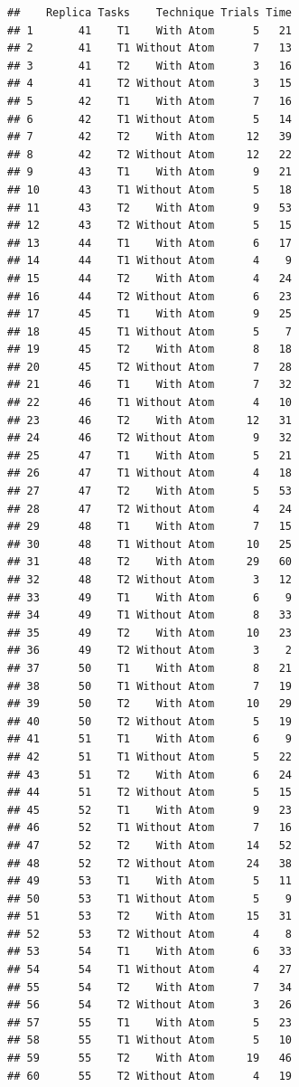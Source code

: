 \documentclass[]{article}
\begin{document}
\begin{verbatim}
##    Replica Tasks    Technique Trials Time
## 1       41    T1    With Atom      5   21
## 2       41    T1 Without Atom      7   13
## 3       41    T2    With Atom      3   16
## 4       41    T2 Without Atom      3   15
## 5       42    T1    With Atom      7   16
## 6       42    T1 Without Atom      5   14
## 7       42    T2    With Atom     12   39
## 8       42    T2 Without Atom     12   22
## 9       43    T1    With Atom      9   21
## 10      43    T1 Without Atom      5   18
## 11      43    T2    With Atom      9   53
## 12      43    T2 Without Atom      5   15
## 13      44    T1    With Atom      6   17
## 14      44    T1 Without Atom      4    9
## 15      44    T2    With Atom      4   24
## 16      44    T2 Without Atom      6   23
## 17      45    T1    With Atom      9   25
## 18      45    T1 Without Atom      5    7
## 19      45    T2    With Atom      8   18
## 20      45    T2 Without Atom      7   28
## 21      46    T1    With Atom      7   32
## 22      46    T1 Without Atom      4   10
## 23      46    T2    With Atom     12   31
## 24      46    T2 Without Atom      9   32
## 25      47    T1    With Atom      5   21
## 26      47    T1 Without Atom      4   18
## 27      47    T2    With Atom      5   53
## 28      47    T2 Without Atom      4   24
## 29      48    T1    With Atom      7   15
## 30      48    T1 Without Atom     10   25
## 31      48    T2    With Atom     29   60
## 32      48    T2 Without Atom      3   12
## 33      49    T1    With Atom      6    9
## 34      49    T1 Without Atom      8   33
## 35      49    T2    With Atom     10   23
## 36      49    T2 Without Atom      3    2
## 37      50    T1    With Atom      8   21
## 38      50    T1 Without Atom      7   19
## 39      50    T2    With Atom     10   29
## 40      50    T2 Without Atom      5   19
## 41      51    T1    With Atom      6    9
## 42      51    T1 Without Atom      5   22
## 43      51    T2    With Atom      6   24
## 44      51    T2 Without Atom      5   15
## 45      52    T1    With Atom      9   23
## 46      52    T1 Without Atom      7   16
## 47      52    T2    With Atom     14   52
## 48      52    T2 Without Atom     24   38
## 49      53    T1    With Atom      5   11
## 50      53    T1 Without Atom      5    9
## 51      53    T2    With Atom     15   31
## 52      53    T2 Without Atom      4    8
## 53      54    T1    With Atom      6   33
## 54      54    T1 Without Atom      4   27
## 55      54    T2    With Atom      7   34
## 56      54    T2 Without Atom      3   26
## 57      55    T1    With Atom      5   23
## 58      55    T1 Without Atom      5   10
## 59      55    T2    With Atom     19   46
## 60      55    T2 Without Atom      4   19
\end{verbatim}
\end{document}
